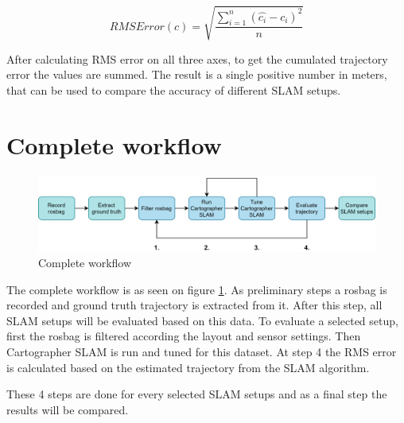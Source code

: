 \begin{equation}\label{eq:rms_formula}
    RMSError(c)=\sqrt{\frac{\sum_{i=1}^{n}(\hat{c_i}-c_i)^2}{n}}
\end{equation}

After calculating RMS error on all three axes, to get the cumulated trajectory error the 
values are summed. The result is a single positive number in meters, that can be used to
compare the accuracy of different SLAM setups.


\section{Complete workflow}

\begin{figure}[!ht]
    \centering
    \includegraphics[width=140mm, keepaspectratio]{figures/workflow.png}
    \caption{Complete workflow}
    \label{fig:workflow}
\end{figure}

The complete workflow is as seen on figure \ref{fig:workflow}. As preliminary steps a rosbag is
recorded and ground truth trajectory is extracted from it. After this step, all SLAM setups
will be evaluated based on this data. To evaluate a selected setup, first the rosbag is
filtered according the layout and sensor settings. Then Cartographer SLAM is run and 
tuned for this dataset. At step 4 the RMS error is calculated based on the estimated 
trajectory from the SLAM algorithm. 

These 4 steps are done for every selected SLAM setups and as a final step the results 
will be compared.


  
 





\newpage


